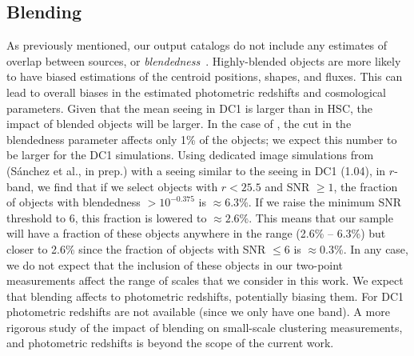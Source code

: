 \documentclass[\docopts]{\docclass}
\begin{document}

\subsection{Blending}
As previously mentioned, our output catalogs do not include any estimates of overlap between sources, or \textit{blendedness}~\citep{2018PASJ...70S...5B}. Highly-blended objects are more likely to have biased estimations of the centroid positions, shapes, and fluxes. This can lead to overall biases in the estimated photometric redshifts and cosmological parameters. Given that the mean seeing in DC1 is larger than in HSC, the impact of blended objects will be larger. In the case of \citet{2018PASJ...70S..25M}, the cut in the blendedness parameter affects only 1\% of the objects; we expect this number to be larger for the DC1 simulations. Using dedicated image simulations from (S\'{a}nchez et al., in prep.) with a seeing similar to the seeing in DC1 (1.04\arcsec), in $r$-band, we find that if we select objects with $r < 25.5$ and SNR $\geq 1$, the fraction of objects with blendedness $ >10^{-0.375}$ is $\approx 6.3\%$. If we raise the minimum SNR threshold to 6, this fraction is lowered to $\approx 2.6\%$. This means that our sample will have a fraction of these objects anywhere in the range (2.6\% -- 6.3\%) but closer to 2.6\% since the fraction of objects with SNR $\leq 6$ is $\approx 0.3\%$. In any case, we do not expect that the inclusion of these objects in our two-point measurements affect the range of scales that we consider in this work. We expect that blending affects to photometric redshifts, potentially biasing them. For DC1 photometric redshifts are not available (since we only have one band). A more rigorous study of the impact of blending on small-scale clustering measurements, and photometric redshifts is beyond the scope of the current work.


\end{document}
